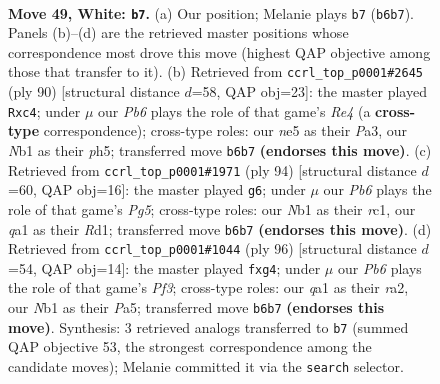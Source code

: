\documentclass[11pt]{article}
\begin{document}
\clearpage

\begin{figure}[p]\centering
\begin{subfigure}{0.46\textwidth}\centering
\resizebox{\linewidth}{!}{%
\newchessgame
\chessboard[
  setfen={2bk1r2/p5Rp/1P6/4nP2/1p1p4/8/4P3/qNK5 w - - 0 49},
  showmover=false,
  pgfstyle=straightmove, color=movearrow, markmove={b6-b7}
]}
\caption{}
\end{subfigure}\hfill
\begin{subfigure}{0.46\textwidth}\centering
\resizebox{\linewidth}{!}{%
\newchessgame
\chessboard[
  setfen={8/5k2/3q2pQ/4p2p/p1p1R3/P1P4P/1r4P1/6K1 w - - 0 46},
  showmover=false,
  pgfstyle=straightmove, color=movearrow, markmove={e4-c4}
]}
\caption{}
\end{subfigure}
\\[4pt]
\begin{subfigure}{0.46\textwidth}\centering
\resizebox{\linewidth}{!}{%
\newchessgame
\chessboard[
  setfen={3r3k/p4R2/P4p2/5NP1/1P3b2/8/3p2K1/2rR4 w - - 2 48},
  showmover=false,
  pgfstyle=straightmove, color=movearrow, markmove={g5-g6}
]}
\caption{}
\end{subfigure}\hfill
\begin{subfigure}{0.46\textwidth}\centering
\resizebox{\linewidth}{!}{%
\newchessgame
\chessboard[
  setfen={4R3/1R3pk1/p3p2p/P6P/5bp1/5P2/r7/6K1 w - - 0 49},
  showmover=false,
  pgfstyle=straightmove, color=movearrow, markmove={f3-g4}
]}
\caption{}
\end{subfigure}
\caption{\textbf{Move 49, White: \texttt{b7}.} (a) Our position; Melanie plays \texttt{b7} (\texttt{b6b7}). Panels (b)--(d) are the retrieved master positions whose correspondence most drove this move (highest QAP objective among those that transfer to it). (b) Retrieved from \texttt{ccrl\_top\_p0001\#2645} (ply 90) [structural distance $d$=58, QAP obj=23]: the master played \texttt{Rxc4}; under $\mu$ our \emph{Pb6} plays the role of that game's \emph{Re4} (a \textbf{cross-type} correspondence); cross-type roles: our \emph{n}e5 as their \emph{P}a3, our \emph{N}b1 as their \emph{p}h5; transferred move \texttt{b6b7} \textbf{(endorses this move)}. (c) Retrieved from \texttt{ccrl\_top\_p0001\#1971} (ply 94) [structural distance $d$=60, QAP obj=16]: the master played \texttt{g6}; under $\mu$ our \emph{Pb6} plays the role of that game's \emph{Pg5}; cross-type roles: our \emph{N}b1 as their \emph{r}c1, our \emph{q}a1 as their \emph{R}d1; transferred move \texttt{b6b7} \textbf{(endorses this move)}. (d) Retrieved from \texttt{ccrl\_top\_p0001\#1044} (ply 96) [structural distance $d$=54, QAP obj=14]: the master played \texttt{fxg4}; under $\mu$ our \emph{Pb6} plays the role of that game's \emph{Pf3}; cross-type roles: our \emph{q}a1 as their \emph{r}a2, our \emph{N}b1 as their \emph{P}a5; transferred move \texttt{b6b7} \textbf{(endorses this move)}. Synthesis: 3 retrieved analogs transferred to \texttt{b7} (summed QAP objective 53, the strongest correspondence among the candidate moves); Melanie committed it via the \texttt{search} selector.}
\label{fig:thought-m96}
\end{figure}
\end{document}
